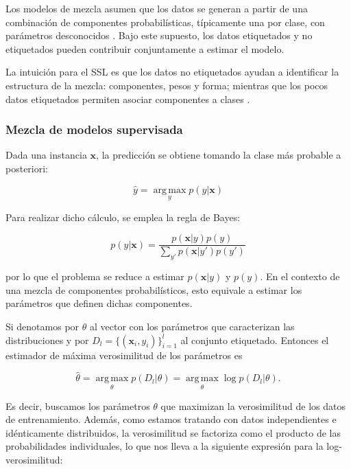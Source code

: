 Los modelos de mezcla asumen que los datos se generan a partir de una combinación de componentes probabilísticas, típicamente una por clase, con parámetros desconocidos \cite{van2020survey}. Bajo este supuesto, los datos etiquetados y no etiquetados pueden contribuir conjuntamente a estimar el modelo.

La intuición para el \gls{SSL} es que los datos no etiquetados ayudan a identificar la estructura de la mezcla: componentes, pesos y forma; mientras que los pocos datos etiquetados permiten asociar componentes a clases \cite{zhu2005semi,zhu2009introduction}.

\subsubsection{Mezcla de modelos supervisada}

Dada una instancia $\mathbf{x}$, la predicción se obtiene tomando la clase más probable a posteriori:

\begin{equation}
    \hat{y} = \operatorname*{arg\,max}_{y} p(y|\mathbf{x})
\end{equation}

Para realizar dicho cálculo, se emplea la regla de Bayes:

\begin{equation}
    p(y|\mathbf{x}) = \frac{p(\mathbf{x}|y)p(y)}{\sum_{y'}p(\mathbf{x}|y')p(y')}
\end{equation}

por lo que el problema se reduce a estimar $p(\mathbf{x}|y)$ y $p(y)$. En el contexto de una mezcla de componentes probabilísticos, esto equivale a estimar los parámetros que definen dichas componentes.  

Si denotamos por $\theta$ al vector con los parámetros que caracterizan las distribuciones y por $D_l=\{(\mathbf{x}_i,y_i)\}_{i=1}^{l}$ al conjunto etiquetado. Entonces el estimador de máxima verosimilitud de los parámetros es

\begin{equation}
    \hat{\theta} = \operatorname*{arg\,max}_{\theta} p(D_l|\theta) = \operatorname*{arg\,max}_{\theta} \log p(D_l|\theta).
\end{equation}

Es decir, buscamos los parámetros $\theta$ que maximizan la verosimilitud de los datos de entrenamiento. Además, como estamos tratando con datos independientes e idénticamente distribuidos, la verosimilitud se factoriza como el producto de las probabilidades individuales, lo que nos lleva a la siguiente expresión para la log-verosimilitud:

